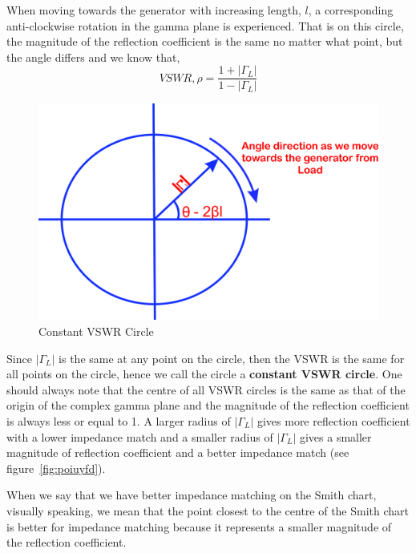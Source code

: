 When moving towards the generator with increasing length, $l$, a corresponding anti-clockwise rotation in the gamma plane is experienced. That is on this circle, the magnitude of the reflection coefficient is the same no matter what point, but the angle differs and we know that,
\begin{equation}
VSWR, \rho = \frac{1 + |\Gamma_L|}{1 - |\Gamma_L|}
\end{equation}
\begin{figure}[h]
\centering
\includegraphics[width=0.7\linewidth]{graphics/lkjhgryn}
\caption{Constant VSWR Circle}
\label{fig:lkjhgryn}
\end{figure}

Since $|\Gamma_L|$ is the same at any point on the circle, then the VSWR is the same for all points on the circle, hence we call the circle a \textbf{constant VSWR circle}. 
One should always note that the centre of all VSWR circles is the same as that of the origin of the complex gamma plane and the magnitude of the reflection coefficient is always less or equal to 1. A larger radius of $|\Gamma_L|$ gives more reflection coefficient with a lower impedance match and a smaller radius of $|\Gamma_L|$ gives a smaller magnitude of reflection coefficient and a better impedance match (see figure~\ref{fig:poiuyfd}).

When we say that we have better impedance matching on the Smith chart, visually speaking, we mean that the point closest to the centre of the Smith chart is better for impedance matching because it represents a smaller magnitude of the reflection coefficient. 

